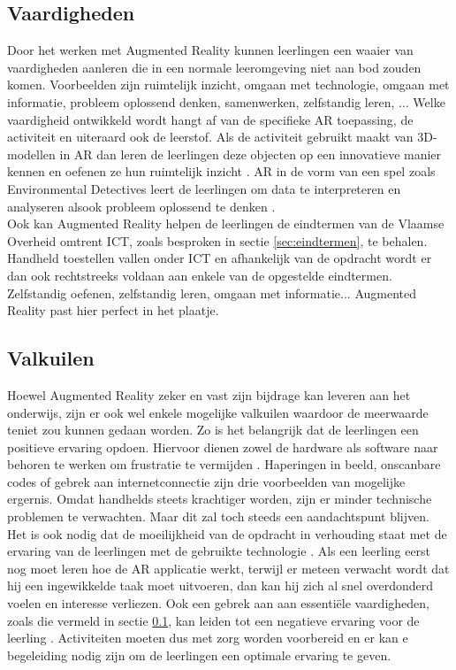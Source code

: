 \documentclass[pdftex,a4paper,12pt,twoside]{report}
\begin{document}
\subsection{Vaardigheden}
\label{sec:vaardigheden}
Door het werken met Augmented Reality kunnen leerlingen een waaier van vaardigheden aanleren die in een normale leeromgeving niet aan bod zouden komen. Voorbeelden zijn ruimtelijk inzicht, omgaan met technologie, omgaan met informatie, probleem oplossend denken, samenwerken, zelfstandig leren, ... Welke vaardigheid ontwikkeld wordt hangt af van de specifieke AR toepassing, de activiteit en uiteraard ook de leerstof. Als de activiteit gebruikt maakt van 3D-modellen in AR dan leren de leerlingen deze objecten op een innovatieve manier kennen en oefenen ze hun ruimtelijk inzicht \citep{aredu}. AR in de vorm van een spel zoals Environmental Detectives leert de leerlingen om data te interpreteren en analyseren alsook probleem oplossend te denken \citep{squire2007augmented}.\\

Ook kan Augmented Reality helpen de leerlingen de eindtermen van de Vlaamse Overheid omtrent ICT, zoals besproken in sectie \ref{sec:eindtermen}, te behalen. Handheld toestellen vallen onder ICT \citep{eindtermen} en afhankelijk van de opdracht wordt er dan ook rechtstreeks voldaan aan enkele van de opgestelde eindtermen. Zelfstandig oefenen, zelfstandig leren, omgaan met informatie... Augmented Reality past hier perfect in het plaatje.

\subsection{Valkuilen}
Hoewel Augmented Reality zeker en vast zijn bijdrage kan leveren aan het onderwijs, zijn er ook wel enkele mogelijke valkuilen waardoor de meerwaarde teniet zou kunnen gedaan worden. Zo is het belangrijk dat de leerlingen een positieve ervaring opdoen. Hiervoor dienen zowel de hardware als software naar behoren te werken om frustratie te vermijden \citep{dunleavy2009affordances}. Haperingen in beeld, onscanbare codes of gebrek aan internetconnectie zijn drie voorbeelden van mogelijke ergernis. Omdat handhelds steets krachtiger worden, zijn er minder technische problemen te verwachten. Maar dit zal toch steeds een aandachtspunt blijven.\\

Het is ook nodig dat de moeilijkheid van de opdracht in verhouding staat met de ervaring van de leerlingen met de gebruikte technologie \cite{dunleavy2009affordances}. Als een leerling eerst nog moet leren hoe de AR applicatie werkt, terwijl er meteen verwacht wordt dat hij een ingewikkelde taak moet uitvoeren, dan kan hij zich al snel overdonderd voelen en interesse verliezen. Ook een gebrek aan aan essenti\"ele vaardigheden, zoals die vermeld in sectie \ref{sec:vaardigheden}, kan leiden tot een negatieve ervaring voor de leerling \citep{aredu}. Activiteiten moeten dus met zorg worden voorbereid en er kan e begeleiding nodig zijn om de leerlingen een optimale ervaring te geven. \\
\end{document}
